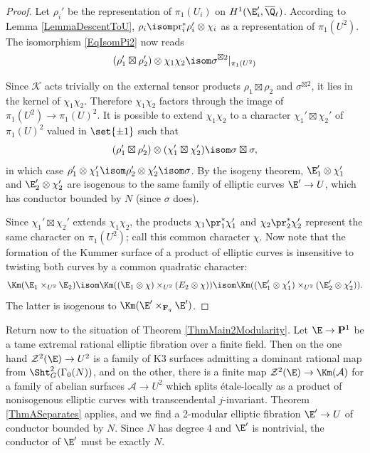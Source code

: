 \documentclass{article}
\def\F{\mathbf{F}}
\def\P{\mathbf{P}}
\begin{document}
\begin{proof} Let $\rho_i'$ be the representation of $\pi_1(U_i)$ on $H^1(\E_i',\overline{\Q}_\ell)$.  According to Lemma \ref{LemmaDescentToU}, $\rho_i\isom \text{pr}_i^*\rho_i'\otimes \chi_i$ as a representation of $\pi_1(U^2)$.  
The isomorphism \eqref{EqIsomPi2} now reads
\[ (\rho_1'\boxtimes \rho_2')\otimes \chi_1\chi_2 \isom \sigma^{\boxtimes 2}\vert_{\pi_1(U^2)} \]    

Since $\mathcal{K}$ acts trivially on the external tensor products $\rho_1\boxtimes \rho_2$ and $\sigma^{\boxtimes 2}$, it lies in the kernel of $\chi_1\chi_2$.  Therefore $\chi_1\chi_2$ factors through the image of $\pi_1(U^2)\to \pi_1(U)^2$.  It is possible to extend $\chi_1\chi_2$ to a character $\chi_1'\boxtimes\chi_2'$ of $\pi_1(U)^2$ valued in $\set{\pm 1}$ such that
\[ (\rho_1'\boxtimes \rho_2')\otimes (\chi_1'\boxtimes\chi_2') \isom \sigma\boxtimes \sigma, \]
in which case $\rho_1'\otimes \chi_1'\isom \rho_2'\otimes \chi_2'\isom\sigma$.  By the isogeny theorem, $\E_1'\otimes\chi_1'$ and $\E_2'\otimes\chi_2'$ are isogenous to the same family of elliptic curves $\E'\to U$, which has conductor bounded by $N$ (since $\sigma$ does).  

Since $\chi_1'\boxtimes \chi_2'$ 
extends $\chi_1\chi_2$, 
the products $\chi_1\pr_1^*\chi_1'$ 
and $\chi_2\pr_2^*\chi_2'$ 
represent the same character on $\pi_1(U^2)$;  
call this common character $\chi$.  
Now note that the formation of the Kummer surface of a product of elliptic curves is insensitive to twisting both curves by a common quadratic character: 
\[
\Km(\E_1\times_{U^2} \E_2)\isom \Km((\E_1\otimes \chi)\times_{U^2} (E_2\otimes\chi))\isom 
\Km((\E_1'\otimes\chi_1')\times_{U^2} (\E_2'\otimes\chi_2')). \]
The latter is isogenous to $\Km(\E'\times_{\F_q} \E')$.  
\end{proof}

Return now to the situation of Theorem \ref{ThmMain2Modularity}.  Let $\E\to \P^1$ be a tame extremal rational elliptic fibration over a finite field.  Then on the one hand $\mathcal{Z}^2(\E)\to U^2$ is a family of K3 surfaces admitting a dominant rational map from $\Sht_G^2(\Gamma_0(N))$, and on the other, there is a finite map $\mathcal{Z}^2(\E)\to \Km(\mathcal{A})$ for a family of abelian surfaces $\mathcal{A}\to U^2$ which splits \'etale-locally as a product of nonisogenous elliptic curves with transcendental $j$-invariant.  Theorem \ref{ThmASeparates} applies, and we find a 2-modular elliptic fibration $\E'\to U$ of conductor bounded by $N$.  Since $N$ has degree 4 and $\E'$ is nontrivial, the conductor of $\E'$ must be exactly $N$.   
\end{document}
